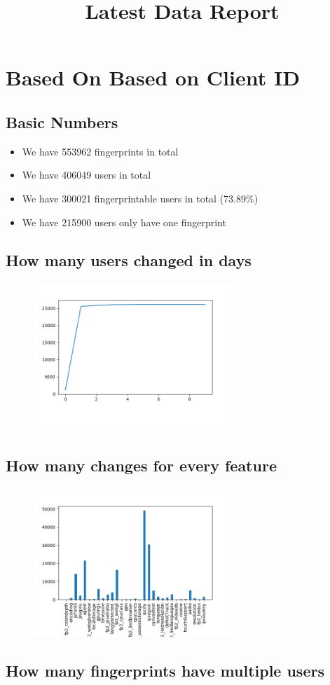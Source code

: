 \documentclass[10pt, conference, compsocconf]{IEEEtran}
\begin{document}
\title{Latest Data Report}
\author{
}
\maketitle
\section{Based On Based on Client ID}
\subsection{Basic Numbers}
\begin{itemize}\item We have 553962 fingerprints in total\item We have 406049 users in total\item We have 300021 fingerprintable users in total (73.89\%)\item We have 215900 users only have one fingerprint \end{itemize}\subsection{How many users changed in days}
\begin{figure}[H]\centering\includegraphics[width=75mm,scale=0.5]{BasedonClientIDchangebytime}\end{figure}\subsection{How many changes for every feature}
\begin{figure}[H]\centering\includegraphics[width=75mm,scale=0.5]{BasedonClientIDfeaturechange}\end{figure}\subsection{How many fingerprints have multiple users}
\end{document}

